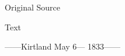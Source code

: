 			
			\begin{description}
				\item[Original Source]
			\end{description}
			
			
			\begin{description}
				\item[Text]
			\end{description}
			
				\begin{tightcenter}
				------Kirtland May 6--- 1833------
				\end{tightcenter}
				
